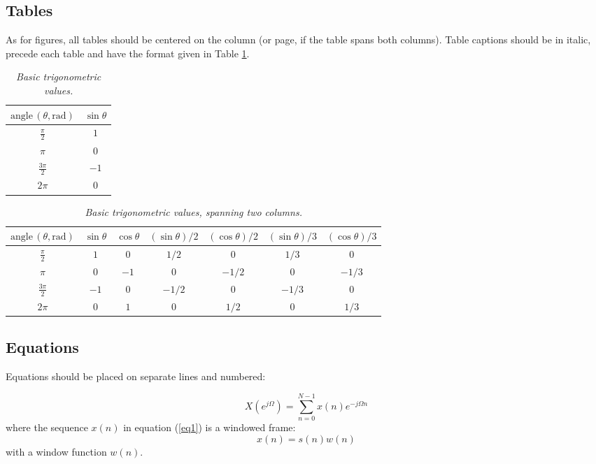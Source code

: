 \documentclass{article}
\begin{document}
\subsection{Tables}
As for figures, all tables should be centered on the column (or page, if the table spans both columns).
Table captions should be in italic, precede each table and have the format given in Table \ref{tab:example}.

\begin{table}[ht]
  \caption{\itshape Basic trigonometric values.}
	\centering
	\begin{tabular}{|c|c|}
		\hline
		$\mathrm{angle}\,(\theta, \mathrm{rad})$ & $\sin \theta$ \\\hline
		$\frac{\pi}{2}$ & $1$ \\
		$\pi$ & $0$ \\
		$\frac{3\pi}{2}$ & $-1$ \\
		$2\pi$ & $0$ \\\hline
	\end{tabular}
	\label{tab:example}
\end{table}

\begin{table}[ht]
  \caption{{\it Basic trigonometric values, spanning two columns.}}
	\centering
  \begin{tabular}{|c|c|c|c|c|c|c|}\hline
    $\mathrm{angle}\, (\theta, \mathrm{rad})$ & $\sin \theta$ & $\cos \theta $ & $(\sin \theta)/2 $ & $(\cos \theta) /2 $ & $(\sin \theta)/3 $ & $(\cos \theta)/3$    \\\hline
    $\frac{\pi}{2}$ & $1$ & $0$ & $1/2$ & $0$ & $1/3$ & $0$ \\
    $\pi$ & $0$ & $-1$ & $0$ & $-1/2$ & $0$ & $-1/3$\\
    $\frac{3\pi}{2}$ & $-1$ & $0$ & $-1/2$ & $0$ & $-1/3$ & $0$ \\
    $2\pi$ & $0$ & $1$ & $0$ & $1/2$ & $0$ & $1/3$ \\\hline
 \end{tabular}
  \label{tab:example2}
\end{table}

\subsection{Equations}
Equations should be placed on separate lines and numbered:

\begin{equation}
	X(e^{j\Omega})=\sum_{n=0}^{N-1}x(n)e^{-j\Omega n}
	\label{eq1}
	\end{equation}
	where the sequence $x(n)$ in equation (\ref{eq1}) is a windowed frame:
	\begin{equation}
	x(n)=s(n) w(n)
	\label{eq2}
\end{equation}
%
with a window function $w(n)$.
\end{document}
